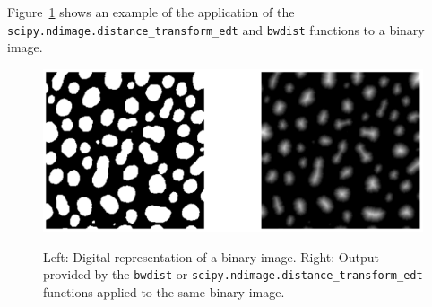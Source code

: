 \documentclass{article}
\begin{document}
Figure~\ref{Fig:BWD} shows an example of the application of the \texttt{scipy.ndimage.distance\_transform\_edt} and \texttt{bwdist} functions to a binary image.
\begin{figure}[!h]
\begin{center}
\includegraphics[width=.90\textwidth]{BWD.png}
\label{Fig:BWD}
\caption{Left: Digital representation of a binary image. Right: Output provided by the \texttt{bwdist} or \texttt{scipy.ndimage.distance\_transform\_edt} functions applied to the same binary image.}
\end{center}
\end{figure}
\end{document}
